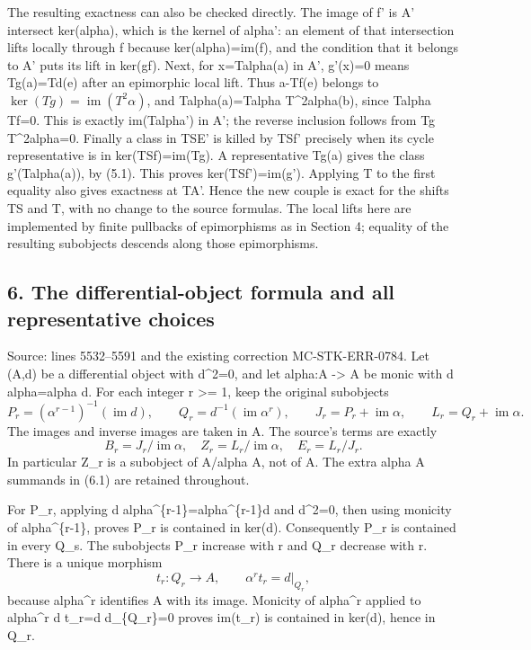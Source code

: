 \documentclass[11pt]{article}
\begin{document}
The resulting exactness can also be checked directly. The image of f' is A' intersect ker(alpha), which is the kernel of alpha': an element of that intersection lifts locally through f because ker(alpha)=im(f), and the condition that it belongs to A' puts its lift in ker(gf). Next, for x=Talpha(a) in A', g'(x)=0 means Tg(a)=Td(e) after an epimorphic local lift. Thus a-Tf(e) belongs to \(\ker(Tg)=\operatorname{im}(T^2\alpha)\), and Talpha(a)=Talpha T\^{}2alpha(b), since Talpha Tf=0. This is exactly im(Talpha') in A'; the reverse inclusion follows from Tg T\^{}2alpha=0. Finally a class in TSE' is killed by TSf' precisely when its cycle representative is in ker(TSf)=im(Tg). A representative Tg(a) gives the class g'(Talpha(a)), by (5.1). This proves ker(TSf')=im(g'). Applying T to the first equality also gives exactness at TA'. Hence the new couple is exact for the shifts TS and T, with no change to the source formulas. The local lifts here are implemented by finite pullbacks of epimorphisms as in Section 4; equality of the resulting subobjects descends along those epimorphisms.

\subsection{6. The differential-object formula and all representative choices}\label{note-05-the-differential-object-formula-and-all-representative-choices}

Source: lines 5532--5591 and the existing correction MC-STK-ERR-0784. Let (A,d) be a differential object with d\^{}2=0, and let alpha:A -\textgreater{} A be monic with d alpha=alpha d. For each integer r \textgreater= 1, keep the original subobjects \[
P_r=(\alpha^{r-1})^{-1}(\operatorname{im}d),\qquad
Q_r=d^{-1}(\operatorname{im}\alpha^r),\qquad
J_r=P_r+\operatorname{im}\alpha,\qquad
L_r=Q_r+\operatorname{im}\alpha.                           \tag{6.1}
\] The images and inverse images are taken in A. The source's terms are exactly \[
B_r=J_r/\operatorname{im}\alpha,\quad
Z_r=L_r/\operatorname{im}\alpha,\quad
E_r=L_r/J_r.                                             \tag{6.2}
\] In particular Z\_r is a subobject of A/alpha A, not of A. The extra alpha A summands in (6.1) are retained throughout.

For P\_r, applying d alpha\^{}\{r-1\}=alpha\^{}\{r-1\}d and d\^{}2=0, then using monicity of alpha\^{}\{r-1\}, proves P\_r is contained in ker(d). Consequently P\_r is contained in every Q\_s. The subobjects P\_r increase with r and Q\_r decrease with r. There is a unique morphism \[
t_r:Q_r\longrightarrow A,\qquad
\alpha^r t_r=d|_{Q_r},                                   \tag{6.3}
\] because alpha\^{}r identifies A with its image. Monicity of alpha\^{}r applied to alpha\^{}r d t\_r=d d\textbar\_\{Q\_r\}=0 proves im(t\_r) is contained in ker(d), hence in Q\_r.
\end{document}
